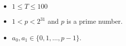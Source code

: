 \begin{itemize}
\tightlist
\item $1 \le T \le 100$
\item $1 < p < 2^{31}$ and $p$ is a prime number.
\item $a_0,a_1\in\{0,1,\dots,p-1\}$.
\end{itemize}

